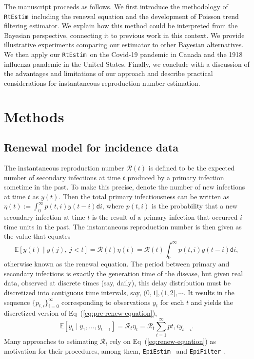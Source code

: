 \documentclass[10pt,letterpaper]{article}
\def\RtEstim{\texttt{RtEstim}}
\def\EpiEstim{\texttt{EpiEstim}}
\def\bbE{\mathbb{E}}
\def\calR{\mathcal{R}}
\def\diff{\mathsf{d}}
\renewcommand{\eqref}[1]{Eq~(\ref{#1})}
\begin{document}
The manuscript proceeds as follows. We first introduce the methodology of
\RtEstim\ including the renewal equation and the development of Poisson
trend filtering estimator. We explain how this method could be interpreted from
the Bayesian perspective, connecting it to previous work in this context. We
provide illustrative experiments comparing our estimator to other Bayesian alternatives. 
We then apply our \RtEstim\ on the Covid-19 pandemic in Canada and 
the 1918 influenza pandemic in the United States. Finally, we conclude 
with a discussion of the advantages and limitations of our approach and describe 
practical considerations for instantaneous reproduction number estimation.


\section{Methods}

\subsection{Renewal model for incidence data} 

The instantaneous reproduction number $\calR(t)$ is defined to be the expected
number of secondary infections at time $t$ produced by a primary infection
sometime in the past. To make this precise, denote the number of new infections
at time $t$ as $y(t)$. Then the total primary infectiousness can be written as
$\eta(t) := \int_0^{\infty} p(t,i) y(t-i) \diff i$, where $p(t,i)$ is the
probability that a new secondary infection at time $t$ is the result of a primary infection
that occurred $i$ time units in the past. The instantaneous reproduction number is then given
as the value that equates
\begin{equation} \label{eq:pre-renew-equation}
  \bbE[y(t) \mid y(j),\ j<t]=\calR(t)\eta(t)=\calR(t)\int_0^\infty p(t,i)y(t-i)\diff i,
\end{equation}
otherwise known as the renewal equation. The period between primary and secondary
infections is exactly the generation time of the disease, but given real data,
observed at discrete times (say, daily), this delay distribution must be discretized
into contiguous time intervals,
say, $(0,1], (1,2], \cdots$. It results in the sequence $\{p_{t,i}\}_{i=0}^\infty$
corresponding to observations $y_t$ for each $t$ and yields the
discretized version of \eqref{eq:pre-renew-equation},
\begin{equation} \label{eq:renew-equation}
  \bbE[y_t \mid y_1,\ldots,y_{t-1}]=\calR_t\eta_t=\calR_t\sum_{i = 1}^\infty p{t,i} y_{t-i}.
\end{equation}
Many approaches to estimating $\calR_t$ rely on \eqref{eq:renew-equation} as
motivation for their procedures, among them, \EpiEstim\ \cite{cori2013new} 
and \texttt{EpiFilter} \cite{parag2021improved}. 
\end{document}
